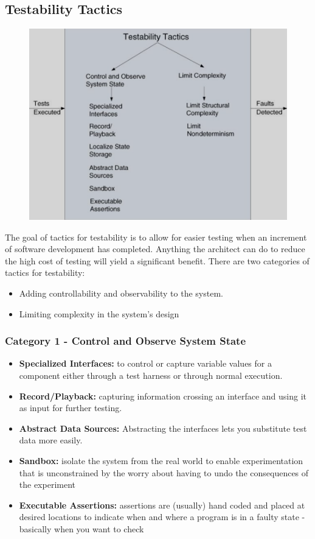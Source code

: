 \documentclass[a4paper]{article}
\begin{document}
\subsection{Testability Tactics}
\begin{figure}[H]
\centering 
\includegraphics[scale=0.3]{images/testability-tactics.png}
\end{figure}

The goal of tactics for testability is to allow for
easier testing when an increment of software
development has completed. Anything the architect can do to reduce the high
cost of testing will yield a significant benefit. There are two categories of tactics for testability:
\begin{itemize}
\item Adding controllability and observability to the system.
\item Limiting complexity in the system’s design
\end{itemize}

\subsubsection{Category 1 - Control and Observe System State}
\begin{itemize}
\item \textbf{Specialized Interfaces:} to control or capture
variable values for a component either through a
test harness or through normal execution.
\item \textbf{Record/Playback:} capturing information crossing
an interface and using it as input for further
testing.
\item \textbf{Abstract Data Sources:} Abstracting the interfaces
lets you substitute test data more easily. 
\item \textbf{Sandbox:} isolate the system from the real world
to enable experimentation that is unconstrained
by the worry about having to undo the
consequences of the experiment
\item \textbf{Executable Assertions:} assertions are (usually)
hand coded and placed at desired locations to
indicate when and where a program is in a faulty
state - basically when you want to check 

\end{itemize}
\end{document}

